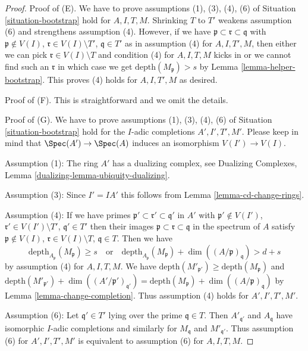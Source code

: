 \begin{proof}
Proof of (E). We have to prove assumptions (1), (3), (4), (6)
of Situation \ref{situation-bootstrap} hold for
$A, I, T, M$. Shrinking $T$ to $T'$
weakens assumption (6) and strengthens assumption (4). However, if we have
$\mathfrak p \subset \mathfrak r \subset \mathfrak q$ with
$\mathfrak p \not \in V(I)$, $\mathfrak r \in V(I) \setminus T'$,
$\mathfrak q \in T'$ as in assumption (4) for $A, I, T', M$, then
either we can pick $\mathfrak r \in V(I) \setminus T$ and
condition (4) for $A, I, T, M$ kicks in or we cannot
find such an $\mathfrak r$ in which case we get
$\text{depth}(M_\mathfrak p) > s$ by Lemma \ref{lemma-helper-bootstrap}.
This proves (4) holds for $A, I, T', M$ as desired.

\medskip\noindent
Proof of (F). This is straightforward and we omit the details.

\medskip\noindent
Proof of (G). We have to prove assumptions (1), (3), (4), (6)
of Situation \ref{situation-bootstrap} hold for the $I$-adic
completions $A', I', T', M'$. Please keep in mind that
$\Spec(A') \to \Spec(A)$ induces an isomorphism $V(I') \to V(I)$.

\medskip\noindent
Assumption (1): The ring $A'$ has a dualizing complex, see
Dualizing Complexes, Lemma \ref{dualizing-lemma-ubiquity-dualizing}.

\medskip\noindent
Assumption (3): Since $I' = IA'$ this follows from
Lemma \ref{lemma-cd-change-rings}.

\medskip\noindent
Assumption (4): If we have primes
$\mathfrak p' \subset \mathfrak r' \subset \mathfrak q'$ in $A'$
with $\mathfrak p' \not \in V(I')$,
$\mathfrak r' \in V(I') \setminus T'$,
$\mathfrak q' \in T'$ then their images
$\mathfrak p \subset \mathfrak r \subset \mathfrak q$ in
the spectrum of $A$
satisfy
$\mathfrak p \not \in V(I)$, $\mathfrak r \in V(I) \setminus T$,
$\mathfrak q \in T$.
Then we have
$$
\text{depth}_{A_\mathfrak p}(M_\mathfrak p) \geq s
\quad\text{or}\quad
\text{depth}_{A_\mathfrak p}(M_\mathfrak p) +
\dim((A/\mathfrak p)_\mathfrak q) > d + s
$$
by assumption (4) for $A, I, T, M$. We have
$\text{depth}(M'_{\mathfrak p'}) \geq \text{depth}(M_\mathfrak p)$ and
$\text{depth}(M'_{\mathfrak p'}) +
\dim((A'/\mathfrak p')_{\mathfrak q'}) =
\text{depth}(M_\mathfrak p) +
\dim((A/\mathfrak p)_\mathfrak q)$
by Lemma \ref{lemma-change-completion}.
Thus assumption (4) holds for $A', I', T', M'$.

\medskip\noindent
Assumption (6): Let $\mathfrak q' \in T'$ lying over the
prime $\mathfrak q \in T$. Then $A'_{\mathfrak q'}$
and $A_\mathfrak q$ have isomorphic $I$-adic completions
and similarly for $M_\mathfrak q$ and $M'_{\mathfrak q'}$.
Thus assumption (6) for $A', I', T', M'$ is equivalent
to assumption (6) for $A, I, T, M$.


\end{proof}
